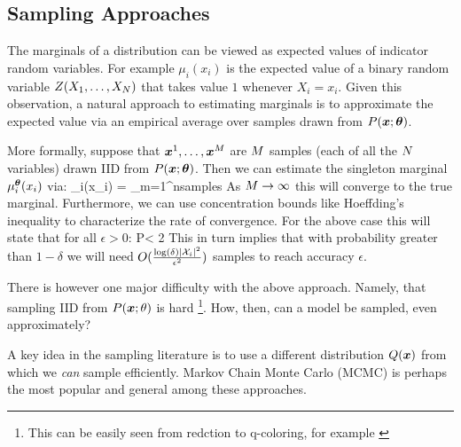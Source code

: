 \subsection{Sampling Approaches}
\label{sec:sampling}
The marginals of a distribution can be viewed as expected values of indicator random variables. For example $\mu_i(x_i)$ is the expected value of a binary
random variable $Z(X_1,\ldots,X_{N})$ that takes value $1$ whenever $X_i=x_i$. Given this observation, a natural approach to estimating marginals is to approximate the expected value via an empirical average over samples drawn from $P(\boldsymbol{x};\boldsymbol{\theta})$. 

More formally, suppose that $\boldsymbol{x}^{1},\ldots,\boldsymbol{x}^{M}$ are $M$ samples (each of all the $N$ variables) drawn IID from $P(\boldsymbol{x};\boldsymbol{\theta})$. Then we can estimate the singleton marginal $\mu^{\boldsymbol{\theta}}_i(x_i)$ via:
\be
\hat{\mu}_i(x_i) = \sum_{m=1}^{nsamples} 
\ee
As $M \to \infty$ this will converge to the true marginal. Furthermore, we can use concentration bounds like Hoeffding's inequality to characterize the rate of convergence. For the above case this will state that for all $\epsilon > 0$:
\be
P < 2
\ee
This in turn implies that with probability greater than $1-\delta$ we will need $O(\frac{\log(\delta) |{\cal X}_i|^2}{\epsilon^2})$ samples to reach accuracy $\epsilon$.

There is however one major difficulty with the above approach.
Namely, that sampling IID from $P(\boldsymbol{x};\theta)$ is hard \footnote{This can be easily seen from redction to q-coloring, for example \cite{levin2009markov, bordewich2016mixing}}.
How, then, can a model be sampled, even approximately?

A key idea in the sampling literature is to use a different distribution $Q(\boldsymbol{x})$ from which we {\em can} sample efficiently. 
Markov Chain Monte Carlo (MCMC) is perhaps the most popular and general among these approaches\cite{andrieu2003introduction,levin2009markov}.


